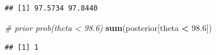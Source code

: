 \documentclass[
]{book}
\newenvironment{Shaded}{\begin{snugshade}}{\end{snugshade}}
\newcommand{\CommentTok}[1]{\textcolor[rgb]{0.56,0.35,0.01}{\textit{#1}}}
\newcommand{\FloatTok}[1]{\textcolor[rgb]{0.00,0.00,0.81}{#1}}
\newcommand{\KeywordTok}[1]{\textcolor[rgb]{0.13,0.29,0.53}{\textbf{#1}}}
\newcommand{\NormalTok}[1]{#1}
\newcommand{\OperatorTok}[1]{\textcolor[rgb]{0.81,0.36,0.00}{\textbf{#1}}}
\newcommand{\StringTok}[1]{\textcolor[rgb]{0.31,0.60,0.02}{#1}}
\theoremstyle{definition}
\theoremstyle{definition}
\theoremstyle{definition}
\theoremstyle{remark}
\begin{document}
\begin{verbatim}
## [1] 97.5734 97.8440
\end{verbatim}

\begin{Shaded}
\begin{Highlighting}[]
\CommentTok{\# prior prob(theta \textless{} 98.6)}
\KeywordTok{sum}\NormalTok{(posterior[theta }\OperatorTok{\textless{}}\StringTok{ }\FloatTok{98.6}\NormalTok{])}
\end{Highlighting}
\end{Shaded}

\begin{verbatim}
## [1] 1
\end{verbatim}

  
\end{document}
